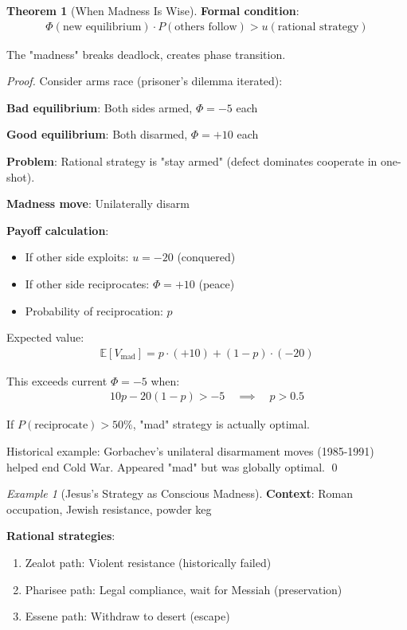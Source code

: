 \documentclass[11pt,a4paper]{article}
\theoremstyle{definition}
\newtheorem{theorem}{Theorem}[section]
\theoremstyle{remark}
\newtheorem{example}{Example}[section]
\begin{document}
\begin{small}
\begin{enumerate}
\begin{theorem}[When Madness Is Wise]
\textbf{Formal condition}:
\begin{align}
\Phi(\text{new equilibrium}) \cdot P(\text{others follow}) > u(\text{rational strategy})
\end{align}

The "madness" breaks deadlock, creates phase transition.
\end{theorem}

\begin{proof}
Consider arms race (prisoner's dilemma iterated):

\textbf{Bad equilibrium}: Both sides armed, \(\Phi = -5\) each

\textbf{Good equilibrium}: Both disarmed, \(\Phi = +10\) each

\textbf{Problem}: Rational strategy is "stay armed" (defect dominates cooperate in one-shot).

\textbf{Madness move}: Unilaterally disarm

\textbf{Payoff calculation}:
\begin{itemize}
    \item If other side exploits: \(u = -20\) (conquered)
    \item If other side reciprocates: \(\Phi = +10\) (peace)
    \item Probability of reciprocation: \(p\)
\end{itemize}

Expected value:
\begin{align}
\mathbb{E}[V_{\text{mad}}] = p \cdot (+10) + (1-p) \cdot (-20)
\end{align}

This exceeds current \(\Phi = -5\) when:
\begin{align}
10p - 20(1-p) > -5 \quad \implies \quad p > 0.5
\end{align}

If \(P(\text{reciprocate}) > 50\%\), "mad" strategy is actually optimal.

Historical example: Gorbachev's unilateral disarmament moves (1985-1991) helped end Cold War. Appeared "mad" but was globally optimal. \qed
\end{proof}

\begin{example}[Jesus's Strategy as Conscious Madness]
\textbf{Context}: Roman occupation, Jewish resistance, powder keg

\textbf{Rational strategies}:
\begin{enumerate}
    \item Zealot path: Violent resistance (historically failed)
    \item Pharisee path: Legal compliance, wait for Messiah (preservation)
    \item Essene path: Withdraw to desert (escape)
\end{enumerate}


\end{example}
\end{enumerate}
\end{small}
\end{document}
